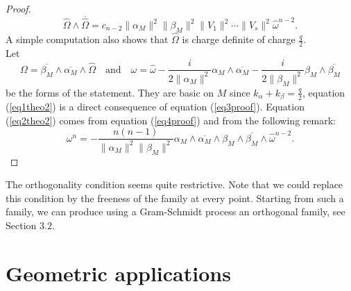 \documentclass[12pt, reqno]{amsart}
\begin{document}
\begin{proof}
    \begin{equation}\label{eq4proof}
        \hat\Omega\wedge\overline{\hat\Omega}=c_{n-2}\|\alpha_M\|^2\|\beta_M\|^2\|V_1\|^2\cdots\|V_s\|^2\hat\omega^{n-2}.
    \end{equation}
    A simple computation also shows that $\hat\Omega$ is charge definite of charge $\frac{q}{2}$.\\ \indent Let \[\Omega=\overline{\beta_M}\wedge\overline{\alpha_M}\wedge\hat\Omega\quad\text{and}\quad\omega=\hat\omega-\frac{i}{2\|\alpha_M\|^2}\alpha_M\wedge\overline{\alpha_M}-\frac{i}{2\|\beta_M\|^2}\beta_M\wedge\overline{\beta_M}\] be the forms of the statement. They are basic on $M$ since $k_\alpha+k_\beta=\frac{q}{2}$, equation (\ref{eq1theo2}) is a direct consequence of equation (\ref{eq3proof}). Equation (\ref{eq2theo2}) comes from equation (\ref{eq4proof}) and from the following remark:
    \[\omega^n=-\frac{n(n-1)}{\|\alpha_M\|^2\|\beta_M\|^2}\alpha_M\wedge\overline{\alpha_M}\wedge\beta_M\wedge\overline{\beta_M}\wedge\hat\omega^{n-2}.\]
\end{proof}
The orthogonality condition seems quite restrictive. Note that we could replace this condition by the freeness of the family at every point. Starting from such a family, we can produce using a Gram-Schmidt process an orthogonal family, see Section $3.2$.
\section{Geometric applications}
\end{document}
